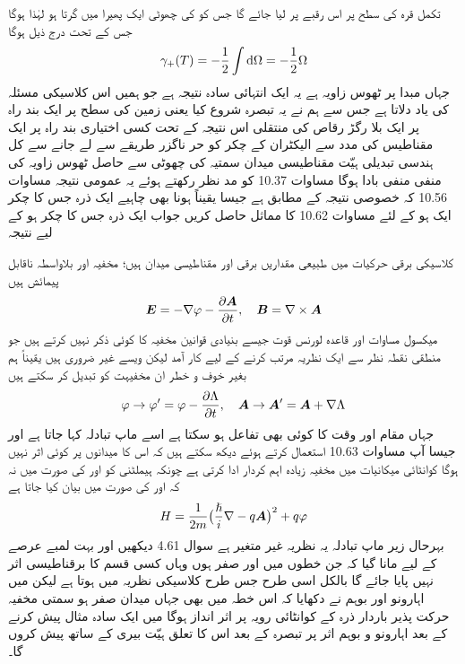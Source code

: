تکمل قرہ کی سطح پر اس رقبے پر لیا جائے گا جس کو  کی چھوٹی ایک پھیرا میں گرتا ہو لہٰذا  ہوگا جس کے تحت درج ذیل ہوگا 
\begin{align} 
\gamma_{+} (T) = - \frac{1}{2} \int \dif \Omega = - \frac{1}{2} \Omega
\end{align}
جہاں مبدا  پر ٹھوس زاویہ  ہے یہ ایک انتہائی سادہ نتیجہ ہے جو ہمیں اس کلاسیکی مسئلہ کی یاد دلاتا ہے جس سے ہم نے یہ تبصرہ شروع کیا یعنی زمین کی سطح پر ایک بند راہ پر ایک بلا رگڑ   رقاص   کی منتقلی اس نتیجہ کے تحت کسی اختیاری بند راہ پر ایک مقناطیس کی مدد سے الیکٹران کے چکر کو حر ناگزر طریقے سے لے جانے سے کل ہندسی تبدیلی ہیّت مقناطیسی میدان سمتیہ کی چھوٹی سے حاصل ٹھوس زاویہ کی منفی منفی بادا ہوگا مساوات 10.37 کو مد نظر رکھتے ہوئے یہ عمومی نتیجہ مساوات 10.56 کہ خصوصی نتیجہ کے مطابق ہے جیسا یقیناً ہونا بھی چاہیے 
ایک ذرہ جس کا چکر ایک ہو کے لئے مساوات 10.62 کا مماثل حاصل کریں جواب  ایک ذرہ جس کا چکر  ہو کے لیے نتیجہ  


کلاسیکی برقی حرکیات میں طبیعی مقداریں برقی اور مقناطیسی میدان ہیں؛ مخفیہ  اور  بلاواسطہ ناقابل پیمائش ہیں 
\begin{align}
{\ensuremath{{\boldsymbol{E}}}} = - \nabla \varphi - \frac{\partial {\ensuremath{{\boldsymbol{A}}}}}{\partial t}, \quad {\ensuremath{{\boldsymbol{B}}}} = \nabla \times {\ensuremath{{\boldsymbol{A}}}}
\end{align}
میکسول مساوات اور قاعدہ لورنس قوت جیسے بنیادی قوانین مخفیہ کا کوئی ذکر نہیں کرتے ہیں جو منطقی نقطہ نظر سے ایک نظریہ  مرتب کرنے  کے لیے کار آمد لیکن ویسے غیر ضروری ہیں یقیناً ہم بغیر  خوف  و خطر ان مخفیہت کو تبدیل کر سکتے ہیں 
\begin{align}
\varphi \to \varphi' = \varphi - \frac{\partial \Lambda}{\partial t}, \quad {\ensuremath{{\boldsymbol{A}}}} \to {\ensuremath{{\boldsymbol{A}}}}' = {{\boldsymbol{A}}} + \nabla \Lambda
\end{align}
جہاں  مقام اور وقت کا کوئی بھی تفاعل ہو سکتا ہے اسے ماپ تبادلہ کہا جاتا ہے اور جیسا آپ مساوات 10.63 استعمال کرتے ہوئے دیکھ سکتے ہیں کہ اس کا میدانوں پر کوئی اثر نہیں ہوگا کوانٹائی میکانیات میں مخفیہ زیادہ اہم کردار ادا کرتی ہے چونکہ ہیملٹنی کو  اور  کی صورت میں نہ کہ  اور  کی صورت میں بیان کیا جاتا ہے 
\begin{align}
H = \frac{1}{2m} \big ( \frac{\hslash}{i} \nabla - q {{\boldsymbol{A}}} \big )^2 + q \varphi
\end{align}
بہرحال  زیر ماپ تبادلہ یہ نظریہ  غیر متغیر ہے سوال 4.61 دیکھیں اور بہت لمبے  عرصے  کے لیے مانا گیا کہ  جن خطوں میں   اور  صفر ہوں وہاں کسی قسم کا برقناطیسی اثر نہیں پایا جائے گا بالکل اسی طرح جس طرح کلاسیکی نظریہ میں ہوتا ہے لیکن  میں اہارونو اور بوہم نے دکھایا کہ اس خطہ میں بھی جہاں میدان صفر ہو سمتی مخفیہ حرکت پذیر باردار ذرہ کے کوانٹائی رویہ پر اثر انداز ہوگا میں ایک سادہ مثال پیش کرنے کے بعد اہارونو و بوہم   اثر پر تبصرہ کے بعد اس کا تعلق ہیّت بیری کے ساتھ پیش کروں گا۔



